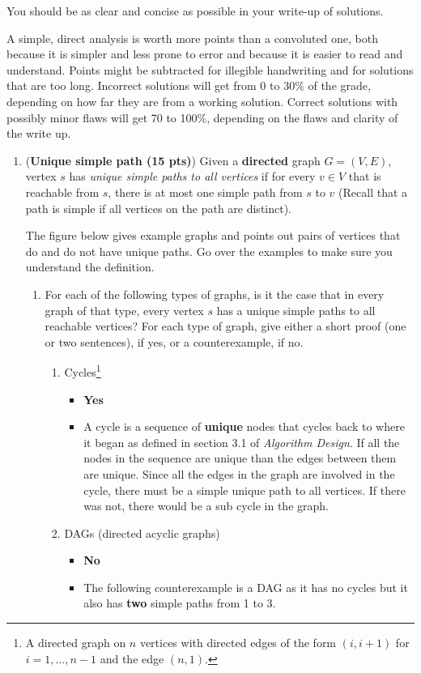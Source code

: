 \documentclass[letterpaper,11pt]{article}
\begin{document}
You should be as clear and concise as possible in your write-up of
solutions. 

A simple, direct analysis is worth more points than a
convoluted one, both because it is simpler and less prone to error and
because it is easier to read and understand. Points might be
subtracted for illegible handwriting and for solutions that are too
long. Incorrect solutions will get from 0 to 30\% of the grade,
depending on how far they are from a working solution. Correct
solutions with possibly minor flaws will get 70 to 100\%, depending on
the flaws and clarity of the write up.

\newpage 
\begin{enumerate}


\item 
({\bf Unique simple path (15 pts)}) Given a {\bf directed} graph $G=(V,E)$, vertex $s$ has \emph{unique simple paths to all vertices} if for every $v\in V$ that is reachable from $s$, there is at most one simple path from $s$ to $v$ (Recall that a path is simple if all vertices on the path are distinct). 

The figure below gives example graphs and points out pairs of vertices that do and do not have unique paths. Go over the examples to make sure you understand the definition.


\begin{enumerate}
    \item For each of the following types of graphs, is it the case that in every graph of that type, every vertex $s$ has a unique simple paths to all reachable vertices? For each type of graph, give either a short proof (one or two sentences), if yes,  or a counterexample, if no.
        \begin{enumerate} 
        \item Cycles\footnote{A directed graph on $n$ vertices with directed edges of the form $(i,i+1)$ for $i=1,...,n-1$ and the edge $(n,1)$.}
            \begin{itemize}
                \color{teal}
                \item \textbf{Yes}
                \item A cycle is a sequence of \textbf{unique} nodes that cycles 
                    back to where it began as defined in section 3.1 of 
                    \textit{Algorithm Design}. If all the nodes in the sequence 
                    are unique than the edges between them are unique. Since
                    all the edges in the graph are involved in the cycle, there 
                    must be a simple unique path to all vertices. If there was
                    not, there would be a sub cycle in the graph.
            \end{itemize}
        \item DAGs (directed acyclic graphs)
            \begin{itemize}
                \color{teal}
                \item \textbf{No}
                \item The following counterexample is a DAG as it has no cycles 
                    but it also has \textbf{two} simple paths from 1 to 3.


\end{itemize}
\end{enumerate}
\end{enumerate}
\end{enumerate}
\end{document}
